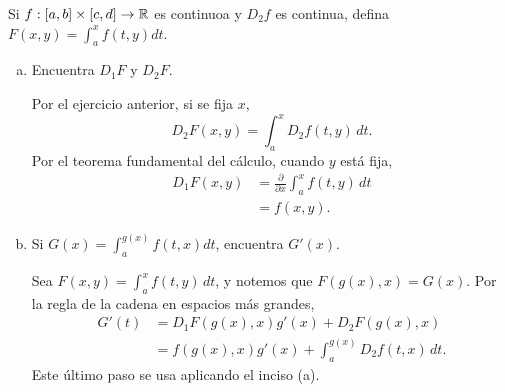 Si \( f : [ a,b ] \times [ c,d ] \to \mathbb{R} \) es continuoa y \( D_2f \) es continua,
defina \( F(x,y) = \int_a^x f(t,y)dt \).
\begin{enumerate}[(a)]
    \item
        Encuentra \( D_1F \) y \( D_2F \).
        \begin{solution}
            Por el ejercicio anterior, si se fija $x$, 
            \[
                D_2 F(x,y)
                =
                \int_a^x D_2 f(t,y)\, dt.
            \]
            Por el teorema fundamental del cálculo, cuando $y$ está fija, 
            \begin{align*}
                D_1 F(x,y)
                &=
                \frac{\partial}{\partial x} 
                \int_a^x
                f(t,y)\, dt\\
                &=
                f(x,y).
            \end{align*}
        \end{solution}
    \item
        Si \( G(x) = \int_a^{g(x)} f(t,x)dt \), encuentra \( G'(x) \).
        \begin{solution}
            Sea $F(x,y)=\int_a^x f(t,y)\,dt$, y notemos que 
            \( F(g(x),x)=G(x) \). Por la regla de la cadena en espacios más grandes, 
            \begin{align*}
                G'(t)
                &=
                D_1F(g(x),x)g'(x)
                +
                D_2F(g(x),x)\\
                &=
                f(g(x),x)g'(x)
                +
                \int_a^{g(x)}
                D_2f(t,x)\,dt.
            \end{align*}
            Este último paso se usa aplicando el inciso (a).
        \end{solution}
\end{enumerate}
